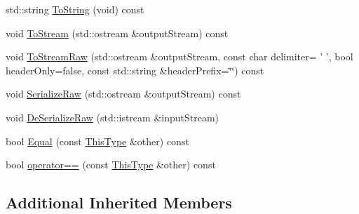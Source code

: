 \begin{DoxyCompactItemize}
\item 
std\-::string \hyperlink{classvct_euler_rotation3_a349acb59de9a6771be003c3a41ee0751}{To\-String} (void) const 
\item 
void \hyperlink{classvct_euler_rotation3_a782fdd1eeb4b28f6d8b95231ea81701e}{To\-Stream} (std\-::ostream \&output\-Stream) const 
\item 
void \hyperlink{classvct_euler_rotation3_ae5f2837e74309b0c5219faa4b8fc53cd}{To\-Stream\-Raw} (std\-::ostream \&output\-Stream, const char delimiter= ' ', bool header\-Only=false, const std\-::string \&header\-Prefix=\char`\"{}\char`\"{}) const 
\item 
void \hyperlink{classvct_euler_rotation3_a109633a8db4df0f0b748c524d5efcf42}{Serialize\-Raw} (std\-::ostream \&output\-Stream) const 
\item 
void \hyperlink{classvct_euler_rotation3_ab1221bb31534a965012934d39762415d}{De\-Serialize\-Raw} (std\-::istream \&input\-Stream)
\end{DoxyCompactItemize}
{\bf }\par
\begin{DoxyCompactItemize}
\item 
bool \hyperlink{classvct_euler_rotation3_abc2bfe6784cac5084eda39665f673e70}{Equal} (const \hyperlink{classvct_euler_rotation3}{This\-Type} \&other) const 
\item 
bool \hyperlink{classvct_euler_rotation3_a1d8bf83313f6909ae9144d50c50a79e7}{operator==} (const \hyperlink{classvct_euler_rotation3}{This\-Type} \&other) const 
\end{DoxyCompactItemize}

\subsection*{Additional Inherited Members}



